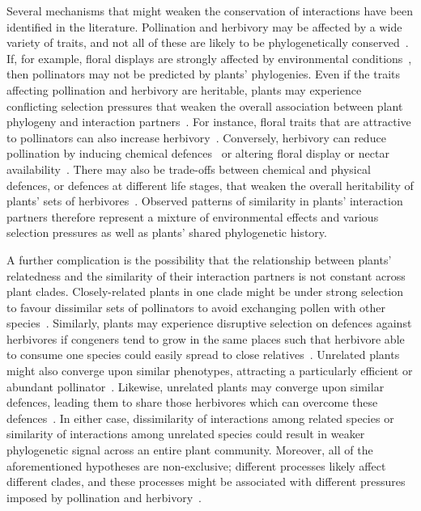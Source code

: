 \documentclass[12pt]{article}
\begin{document}
\begin{spacing}{1.5}
  Several mechanisms that might weaken the conservation of interactions
  have been identified in the literature. Pollination and herbivory may be affected
  by a wide variety of traits, and not all of these are likely to be
  phylogenetically conserved~\citep{Rezende2007,Kursar2009,Ibanez2016}. If, for example,
  floral displays are strongly affected by environmental conditions~\citep{Canto2004}, 
  then pollinators may not be predicted by plants' phylogenies.
  Even if the traits affecting pollination and herbivory are
  heritable, plants may experience conflicting selection pressures that
  weaken the overall association between plant phylogeny and interaction
  partners~\citep{Armbruster1997,Lankau2007,Siepielski2010,Wise2013,Karinho2014}. 
  For instance, floral traits that
  are attractive to pollinators can also increase 
  herbivory~\citep{Strauss2002,Adler2004,Theis2006}. 
  Conversely, herbivory can reduce pollination by inducing chemical 
  defences~\citep{Adler2006} or altering floral display or nectar 
  availability~\citep{Strauss1997}. There may also be trade-offs between chemical and physical defences, or defences at different life stages, that weaken the overall heritability of plants' sets of herbivores~\citep{Karinho2014,Endara2017}. Observed patterns
  of similarity in plants' interaction partners therefore represent
  a mixture of environmental effects and various selection pressures as
  well as plants' shared phylogenetic history.


  A further complication is the possibility that the relationship between
  plants' relatedness and the similarity of their interaction partners is
  not constant across plant clades. Closely-related plants
  in one clade might be under strong selection to favour dissimilar
  sets of pollinators to avoid exchanging pollen with other
  species~\citep{Levin1970,Bell2005,Mitchell2009}. Similarly, plants may experience disruptive selection on defences against herbivores if congeners tend to grow in the same places such that herbivore able to consume one species could easily spread to close relatives~\citep{Kursar2009}. 
  Unrelated plants might also 
  converge upon similar phenotypes, attracting a particularly 
  efficient or abundant pollinator~\citep{Ollerton1996,Wilson2007,Ollerton2009,Ibanez2016}. 
  Likewise, unrelated plants may converge upon similar defences, leading them to share 
  those herbivores which can overcome these defences~\citep{Pichersky2000}. 
  In either case, dissimilarity of interactions among related species 
  or similarity of interactions among unrelated species could result 
  in weaker phylogenetic signal across an entire plant community. 
  Moreover, all of the aforementioned hypotheses 
  are non-exclusive; different processes likely affect different
  clades, and these processes might be associated with different 
  pressures imposed by pollination and herbivory~\citep{Fontaine2015}. 



\end{spacing}
\end{document}
